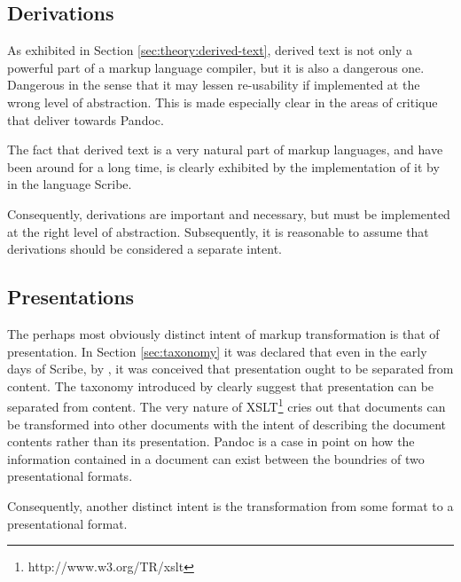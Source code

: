 \documentclass{scrreprt}
\begin{document}
\subsection{Derivations}
As exhibited in Section \ref{sec:theory:derived-text}, derived text is not only a powerful part of a markup language compiler, but it is also a dangerous one. Dangerous in the sense that it may lessen re-usability if implemented at the wrong level of abstraction. This is made especially clear in the areas of critique that \citet{krijnen} deliver towards Pandoc.

The fact that derived text is a very natural part of markup languages, and have been around for a long time, is clearly exhibited by the implementation of it by \citet{reid} in the language Scribe.

Consequently, derivations are important and necessary, but must be implemented at the right level of abstraction. Subsequently, it is reasonable to assume that derivations should be considered a separate intent.

\subsection{Presentations}
The perhaps most obviously distinct intent of markup transformation is that of presentation. In Section \ref{sec:taxonomy} it was declared that even in the early days of Scribe, by \citet{reid}, it was conceived that presentation ought to be separated from content. The taxonomy introduced by \citet{coombs} clearly suggest that presentation can be separated from content. The very nature of XSLT\footnote{http://www.w3.org/TR/xslt} cries out that documents can be transformed into other documents with the intent of describing the document contents rather than its presentation. Pandoc is a case in point on how the information contained in a document can exist between the boundries of two presentational formats.

Consequently, another distinct intent is the transformation from some format to a presentational format.
\end{document}
